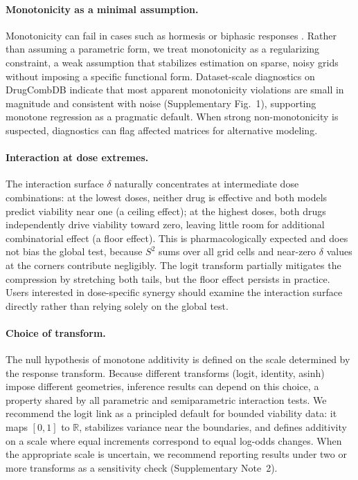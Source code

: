 \documentclass[pdflatex,sn-nature]{sn-jnl}%
\begin{document}
\paragraph{Monotonicity as a minimal assumption.}
Monotonicity can fail in cases such as hormesis or biphasic responses \cite{Meyer2020}.
Rather than assuming a parametric form, we treat monotonicity as a regularizing constraint, a weak assumption that stabilizes estimation on sparse, noisy grids without imposing a specific functional form.
Dataset-scale diagnostics on DrugCombDB indicate that most apparent monotonicity violations are small in magnitude and consistent with noise (Supplementary Fig.~1), supporting monotone regression as a pragmatic default.
When strong non-monotonicity is suspected, diagnostics can flag affected matrices for alternative modeling.

\paragraph{Interaction at dose extremes.}
The interaction surface $\delta$ naturally concentrates at intermediate dose combinations: at the lowest doses, neither drug is effective and both models predict viability near one (a ceiling effect); at the highest doses, both drugs independently drive viability toward zero, leaving little room for additional combinatorial effect (a floor effect).
This is pharmacologically expected and does not bias the global test, because $S^2$ sums over all grid cells and near-zero $\delta$ values at the corners contribute negligibly.
The logit transform partially mitigates the compression by stretching both tails, but the floor effect persists in practice.
Users interested in dose-specific synergy should examine the interaction surface directly rather than relying solely on the global test.

\paragraph{Choice of transform.}
The null hypothesis of monotone additivity is defined on the scale determined by the response transform.
Because different transforms (logit, identity, asinh) impose different geometries, inference results can depend on this choice, a property shared by all parametric and semiparametric interaction tests.
We recommend the logit link as a principled default for bounded viability data: it maps $[0,1]$ to $\mathbb{R}$, stabilizes variance near the boundaries, and defines additivity on a scale where equal increments correspond to equal log-odds changes.
When the appropriate scale is uncertain, we recommend reporting results under two or more transforms as a sensitivity check (Supplementary Note~2).
\end{document}
